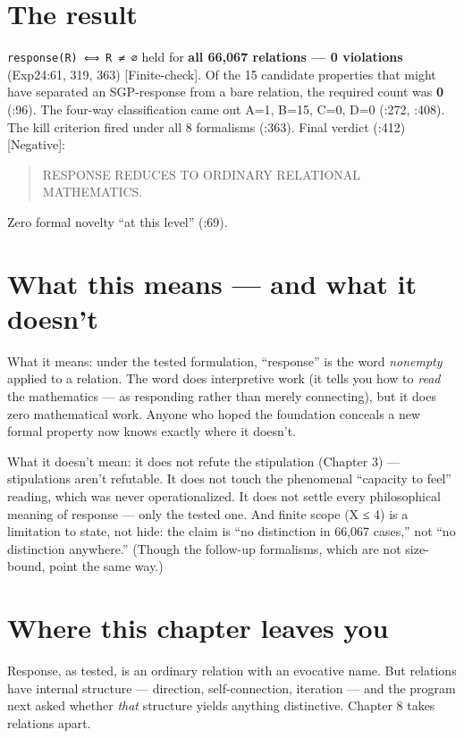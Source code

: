 \documentclass[
  11pt,
]{book}
\begin{document}
\section{The result}\label{the-result}

\texttt{response(R)\ ⟺\ R\ ≠\ ∅} held for \textbf{all 66,067 relations
--- 0 violations} (Exp24:61, 319, 363) {[}Finite-check{]}. Of the 15
candidate properties that might have separated an SGP-response from a
bare relation, the required count was \textbf{0} (:96). The four-way
classification came out A=1, B=15, C=0, D=0 (:272, :408). The kill
criterion fired under all 8 formalisms (:363). Final verdict (:412)
{[}Negative{]}:

\begin{quote}
RESPONSE REDUCES TO ORDINARY RELATIONAL MATHEMATICS.
\end{quote}

Zero formal novelty ``at this level'' (:69).

\section{What this means --- and what it
doesn't}\label{what-this-means-and-what-it-doesnt}

What it means: under the tested formulation, ``response'' is the word
\emph{nonempty} applied to a relation. The word does interpretive work
(it tells you how to \emph{read} the mathematics --- as responding
rather than merely connecting), but it does zero mathematical work.
Anyone who hoped the foundation conceals a new formal property now knows
exactly where it doesn't.

What it doesn't mean: it does not refute the stipulation (Chapter 3) ---
stipulations aren't refutable. It does not touch the phenomenal
``capacity to feel'' reading, which was never operationalized. It does
not settle every philosophical meaning of response --- only the tested
one. And finite scope (\textbar X\textbar{} ≤ 4) is a limitation to
state, not hide: the claim is ``no distinction in 66,067 cases,'' not
``no distinction anywhere.'' (Though the follow-up formalisms, which are
not size-bound, point the same way.)

\section{Where this chapter leaves
you}\label{where-this-chapter-leaves-you-6}

Response, as tested, is an ordinary relation with an evocative name. But
relations have internal structure --- direction, self-connection,
iteration --- and the program next asked whether \emph{that} structure
yields anything distinctive. Chapter 8 takes relations apart.
\end{document}
